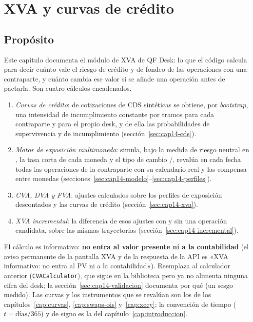 \chapter{XVA y curvas de crédito}\label{cap:xva}

\section{Propósito}\label{sec:cap14-proposito}

Este capítulo documenta el módulo de XVA de QF Desk: lo que el código calcula para decir cuánto vale el riesgo de
crédito y de fondeo de las operaciones con una contraparte, y cuánto cambia ese valor si se añade una operación
antes de pactarla. Son cuatro cálculos encadenados.
\begin{enumerate}
  \item \emph{Curvas de crédito}: de cotizaciones de CDS sintéticas se obtiene, por \emph{bootstrap}, una
        intensidad de incumplimiento constante por tramos para cada contraparte y para el propio desk, y de
        ella las probabilidades de supervivencia y de incumplimiento (sección~\ref{sec:cap14-cds}).
  \item \emph{Motor de exposición multimoneda}: simula, bajo la medida de riesgo neutral en \MXN, la tasa
        corta de cada moneda y el tipo de cambio \USD/\MXN, revalúa en cada fecha todas las operaciones de la
        contraparte con su calendario real y las compensa entre monedas
        (secciones~\ref{sec:cap14-modelo}--\ref{sec:cap14-perfiles}).
  \item \emph{CVA, DVA y FVA}: ajustes calculados sobre los perfiles de exposición descontados y las curvas de
        crédito (sección~\ref{sec:cap14-xva}).
  \item \emph{XVA incremental}: la diferencia de esos ajustes con y sin una operación candidata, sobre las
        mismas trayectorias (sección~\ref{sec:cap14-incremental}).
\end{enumerate}
El cálculo es informativo: \textbf{no entra al valor presente ni a la contabilidad} (el aviso permanente de la
pantalla XVA y de la respuesta de la API es «XVA informativo: no entra al PV ni a la contabilidad»). Reemplaza
al calculador anterior (\texttt{CVACalculator}), que sigue en la biblioteca pero ya no alimenta ninguna cifra
del desk; la sección~\ref{sec:cap14-validacion} documenta por qué (un sesgo medido). Las curvas y los
instrumentos que se revalúan son los de los capítulos~\ref{cap:curvas}, \ref{cap:swaps-ois} y~\ref{cap:xccy};
la convención de tiempo ($t=\text{días}/365$) y de signo es la del capítulo~\ref{cap:introduccion}.

